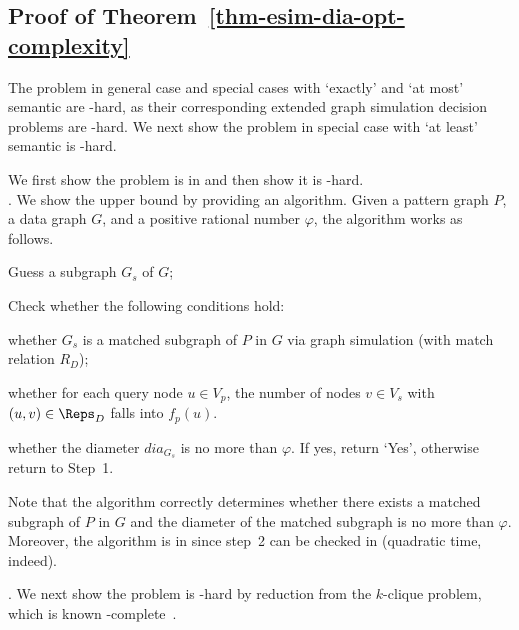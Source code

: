 \subsection*{Proof of Theorem~\ref{thm-esim-dia-opt-complexity}}

The problem in general case and special cases with `exactly' and `at most' semantic are \NP-hard, as their corresponding extended graph simulation decision problems are \NP-hard.
We next show the problem in special case with `at least' semantic is \NP-hard.

We first show the problem is in \NP and then show it is \NP-hard.\\
.
We show the \NP upper bound by providing an \NP algorithm. Given a pattern graph $P$,
a data graph $G$, and a positive rational number $\varphi$, the algorithm works as follows.
\be
\item Guess a subgraph $G_s$ of $G$;
\item Check whether the following conditions hold:
\bi
\item [(a)] whether $G_s$ is a matched subgraph of $P$ in $G$ via graph simulation (with match relation $R_D$);
\item [(b)] whether for each query node $u\in V_p$, the number of nodes $v\in V_s$ with $(u, v)\in \Reps_D$ falls into $f_p(u)$.
\item [(c)] whether the diameter $dia_{G_s}$ is no more than $\varphi$.
\ei
If yes, return `Yes', otherwise return to Step~1.
\ee

Note that the algorithm correctly determines whether there exists a matched subgraph of $P$ in $G$ and the diameter of the matched subgraph is no more than $\varphi$. Moreover, the algorithm is in \NP since step~2 can be checked in \PTIME (quadratic time, indeed).

.
We next show the problem is \NP-hard by reduction from the $k$-clique problem, which is known \NP-complete~\cite{}.

